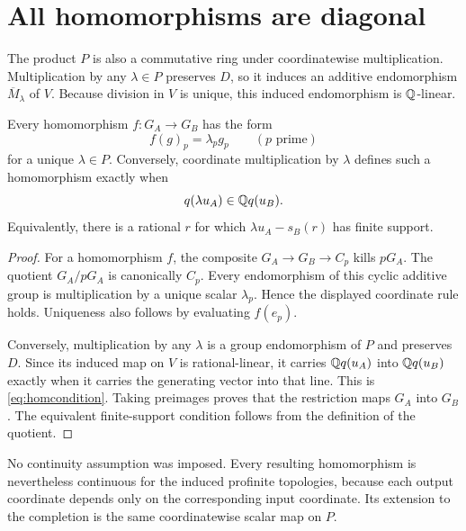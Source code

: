 \section{All homomorphisms are diagonal}
The product $P$ is also a commutative ring under coordinatewise multiplication. Multiplication by any $\lambda\in P$ preserves $D$, so it induces an additive endomorphism $\overline M_\lambda$ of $V$. Because division in $V$ is unique, this induced endomorphism is $\mathbb Q$-linear.

\begin{theorem}
\label{thm:allhom}
Every homomorphism $f:G_A\to G_B$ has the form
\[
f(g)_p=\lambda_p g_p\qquad(p\text{ prime})
\]
for a unique $\lambda\in P$. Conversely, coordinate multiplication by $\lambda$ defines such a homomorphism exactly when
\begin{equation}
\label{eq:homcondition}
q(\lambda u_A)\in\mathbb Q q(u_B).
\end{equation}
Equivalently, there is a rational $r$ for which $\lambda u_A-s_B(r)$ has finite support.
\end{theorem}
\begin{proof}
For a homomorphism $f$, the composite $G_A\to G_B\to C_p$ kills $pG_A$. The quotient $G_A/pG_A$ is canonically $C_p$. Every endomorphism of this cyclic additive group is multiplication by a unique scalar $\lambda_p$. Hence the displayed coordinate rule holds. Uniqueness also follows by evaluating $f(e_p)$.

Conversely, multiplication by any $\lambda$ is a group endomorphism of $P$ and preserves $D$. Since its induced map on $V$ is rational-linear, it carries $\mathbb Q q(u_A)$ into $\mathbb Q q(u_B)$ exactly when it carries the generating vector into that line. This is \eqref{eq:homcondition}. Taking preimages proves that the restriction maps $G_A$ into $G_B$. The equivalent finite-support condition follows from the definition of the quotient.
\end{proof}
No continuity assumption was imposed. Every resulting homomorphism is nevertheless continuous for the induced profinite topologies, because each output coordinate depends only on the corresponding input coordinate. Its extension to the completion is the same coordinatewise scalar map on $P$.

